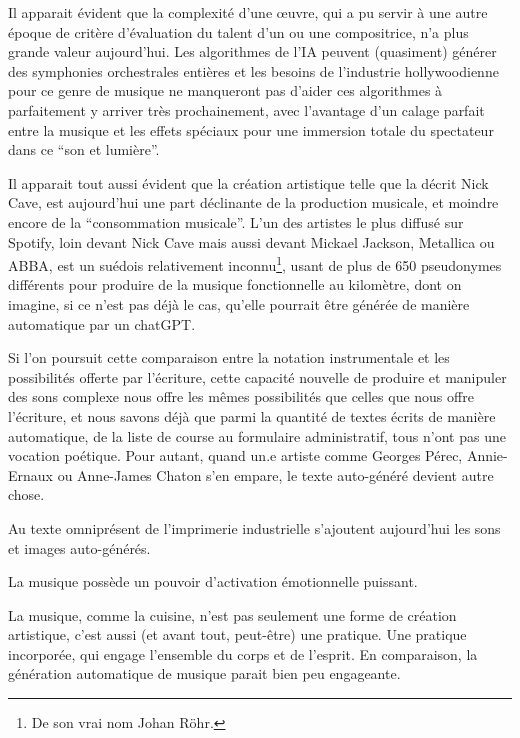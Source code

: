 Il apparait évident que la complexité d'une œuvre, qui a pu servir à une autre époque de critère d'évaluation du talent d'un ou une compositrice, n'a plus grande valeur aujourd'hui. Les algorithmes de l'IA peuvent (quasiment) générer des symphonies orchestrales entières et les besoins de l'industrie hollywoodienne pour ce genre de musique ne manqueront pas d'aider ces algorithmes à parfaitement y arriver très prochainement, avec l'avantage d'un calage parfait entre la musique et les effets spéciaux pour une immersion totale du spectateur dans ce ``son et lumière''.

Il apparait tout aussi évident que la création artistique telle que la décrit Nick Cave, est aujourd'hui une part déclinante de la production musicale, et moindre encore de la ``consommation musicale''. L'un des artistes le plus diffusé sur Spotify, loin devant Nick Cave mais aussi devant Mickael Jackson, Metallica ou ABBA, est un suédois relativement inconnu\footnote{De son vrai nom Johan Röhr.}, usant de plus de 650 pseudonymes différents pour produire de la musique fonctionnelle au kilomètre, dont on imagine, si ce n'est pas déjà le cas, qu'elle pourrait être générée de manière automatique par un chatGPT.

Si l'on poursuit cette comparaison entre la notation instrumentale et les possibilités offerte par l'écriture, cette capacité nouvelle de produire et manipuler des sons complexe nous offre les mêmes possibilités que celles que nous offre l'écriture, et nous savons déjà que parmi la quantité de textes écrits de manière automatique, de la liste de course au formulaire administratif, tous n'ont pas une vocation poétique. Pour autant, quand un.e artiste comme Georges Pérec, Annie-Ernaux ou Anne-James Chaton s'en empare, le texte auto-généré devient autre chose.

Au texte omniprésent de l'imprimerie industrielle s'ajoutent aujourd'hui les sons et images auto-générés.

La musique possède un pouvoir d'activation émotionnelle puissant.

La musique, comme la cuisine, n'est pas seulement une forme de création artistique, c'est aussi (et avant tout, peut-être) une pratique. Une pratique incorporée, qui engage l'ensemble du corps et de l'esprit. En comparaison, la génération automatique de musique parait bien peu engageante.




